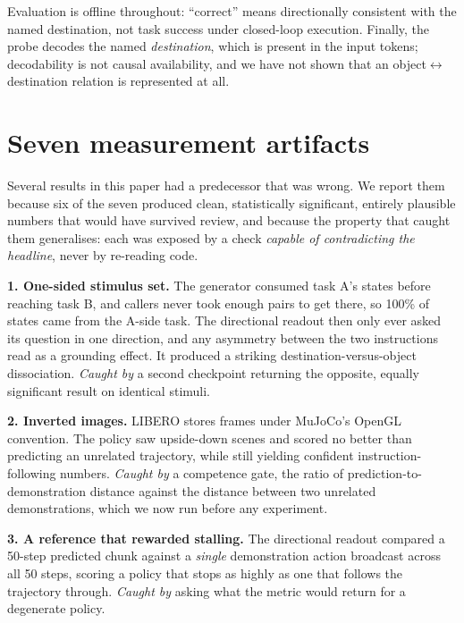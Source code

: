 \documentclass{article}
\begin{document}
Evaluation is offline throughout: ``correct'' means directionally consistent with the named
destination, not task success under closed-loop execution. Finally, the probe decodes the named
\emph{destination}, which is present in the input tokens; decodability is not causal
availability, and we have not shown that an object$\leftrightarrow$destination relation is
represented at all.

\iflong
\appendix
\section{Seven measurement artifacts}
\label{sec:artifacts}

Several results in this paper had a predecessor that was wrong. We report them because six of
the seven produced clean, statistically significant, entirely plausible numbers that would have
survived review, and because the property that caught them generalises: each was exposed by a
check \emph{capable of contradicting the headline}, never by re-reading code.

\textbf{1. One-sided stimulus set.} The generator consumed task A's states before reaching
task B, and callers never took enough pairs to get there, so 100\% of states came from the
A-side task. The directional readout then only ever asked its question in one direction, and any
asymmetry between the two instructions read as a grounding effect. It produced a striking
destination-versus-object dissociation. \emph{Caught by} a second checkpoint returning the
opposite, equally significant result on identical stimuli.

\textbf{2. Inverted images.} LIBERO stores frames under MuJoCo's OpenGL convention. The
policy saw upside-down scenes and scored no better than predicting an unrelated trajectory,
while still yielding confident instruction-following numbers. \emph{Caught by} a competence
gate, the ratio of prediction-to-demonstration distance against the distance between two
unrelated demonstrations, which we now run before any experiment.

\textbf{3. A reference that rewarded stalling.} The directional readout compared a 50-step
predicted chunk against a \emph{single} demonstration action broadcast across all 50 steps,
scoring a policy that stops as highly as one that follows the trajectory through. \emph{Caught
by} asking what the metric would return for a degenerate policy.
\end{document}

